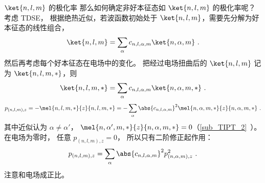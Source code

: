 \begin{example}{$\ket{n,l,m}$ 的极化率}
那么如何确定非好本征态如 $\ket{n,l,m}$ 的极化率呢？ 考虑 TDSE， 根据绝热近似，若波函数初始处于 $\ket{n,l,m}$，需要先分解为好本征态的线性组合，
\begin{equation}
\ket{n,l,m} = \sum_\alpha c_{n,l,\alpha,m} \ket{n,\alpha,m}~.
\end{equation}
然后再考虑每个好本征态在电场中的变化。 把经过电场扭曲后的 $\ket{n,l,m}$ 记为 $\ket{n,l,m,*}$，则
\begin{equation}
\ket{n,l,m,*} = \sum_\alpha c_{n,l,\alpha,m} \ket{n,\alpha,m,*}~.
\end{equation}
\begin{equation}
p_{(n,l,m),z} = -\mel{n,l,m,*}{z}{n,l,m,*} = -\sum_\alpha \abs{c_{n,l,\alpha,m}}^2\mel{n,\alpha,m,*}{z}{n,\alpha,m,*}~.
\end{equation}
其中近似认为 $\alpha\ne\alpha'$， $\mel{n,\alpha',m,*}{z}{n,\alpha,m,*} = 0$（\autoref{sub_TIPT_2}~）。在电场为零时， 任意 $p_{(n,l,m),z} = 0$， 所以只有二阶修正起作用：
\begin{equation}
p_{(n,l,m),z} = \sum_\alpha \abs{c_{n,l,\alpha,m}}^2 p_{(n,\alpha,m),z}^2~.
\end{equation}
注意和电场成正比。
\end{example}
